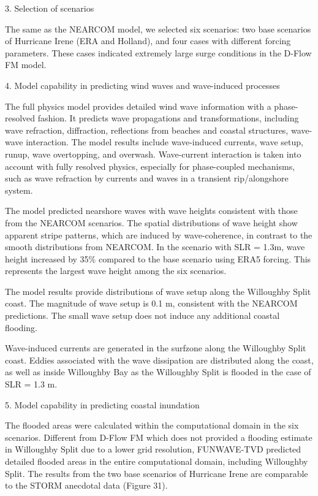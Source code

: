 \documentclass[11pt]{article}
\begin{document}
3. Selection of scenarios

The same as the NEARCOM model, we selected six scenarios: two base scenarios of Hurricane Irene (ERA  and Holland), and four cases with different forcing parameters. These cases indicated extremely large surge conditions in the D-Flow FM model.  

4. Model capability in predicting wind waves and wave-induced processes

The full physics model provides detailed wind wave information with a phase-resolved fashion.  It predicts wave propagations and transformations, including wave refraction, diffraction, reflections from beaches and coastal structures, wave-wave interaction. The model results include wave-induced currents, wave setup, runup, wave overtopping, and overwash. Wave-current interaction is taken into account with fully resolved physics, especially for phase-coupled mechanisms, such as wave refraction by currents and waves in a transient rip/alongshore system. 

The model predicted nearshore waves with wave heights consistent with those from the NEARCOM scenarios. The spatial distributions of wave height show apparent stripe patterns, which are induced by wave-coherence, in contrast to the smooth distributions from NEARCOM. In the scenario with SLR = 1.3m, wave height increased by 35\% compared to the base scenario using ERA5 forcing. This represents the largest wave height among the six scenarios.

The model results provide distributions of wave setup along the Willoughby Split coast. The magnitude of wave setup is 0.1 m, consistent with the NEARCOM predictions. The small wave setup does not induce any additional coastal flooding.  

Wave-induced currents are generated in the surfzone along the Willoughby Split coast. Eddies associated with the wave dissipation are distributed along the coast, as well as inside Willoughby Bay as the Willoughby Split is flooded in the case of SLR = 1.3 m. 

5. Model capability in predicting coastal inundation
 
The flooded areas were calculated within the computational domain in the six scenarios. Different from D-Flow FM which does not provided a flooding estimate in Willoughby Split due to a lower grid resolution, FUNWAVE-TVD predicted detailed flooded areas in the entire computational domain, including Willoughby Split. The results from the two base scenarios of  Hurricane Irene are comparable to the STORM anecdotal data (Figure 31). 
\end{document}
